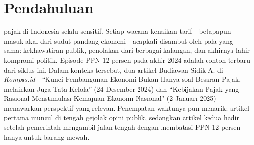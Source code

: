 \section{Pendahuluan}
\label{sec:Pendahuluan}
\setlength{\parskip}{0pt}
\raggedbottom

\newcommand{\abaur}[1]{%
  \footnote{%
    \fontsize{10}{12}\selectfont%
    \setlength{\parindent}{0.5in}%
    \setlength{\parskip}{0pt}%
    \raggedright%
    #1%
  }%
}

 pajak di Indonesia selalu sensitif. Setiap wacana kenaikan tarif—betapapun masuk akal dari sudut pandang ekonomi—acapkali disambut oleh pola yang sama: kekhawatiran publik, penolakan dari berbagai kalangan, dan akhirnya lahir kompromi politik. Episode PPN 12 persen pada akhir 2024 adalah contoh terbaru dari siklus ini. Dalam konteks tersebut, dua artikel Budiawan Sidik A. di \textit{Kompas.id}—“Kunci Pembangunan Ekonomi Bukan Hanya soal Besaran Pajak, melainkan Juga Tata Kelola” (24 Desember 2024) dan “Kebijakan Pajak yang Rasional Menstimulasi Kemajuan Ekonomi Nasional” (2 Januari 2025)—menawarkan perspektif yang relevan. Penempatan waktunya pun menarik: artikel pertama muncul di tengah gejolak opini publik, sedangkan artikel kedua hadir setelah pemerintah mengambil jalan tengah dengan membatasi PPN 12 persen hanya untuk barang mewah.


